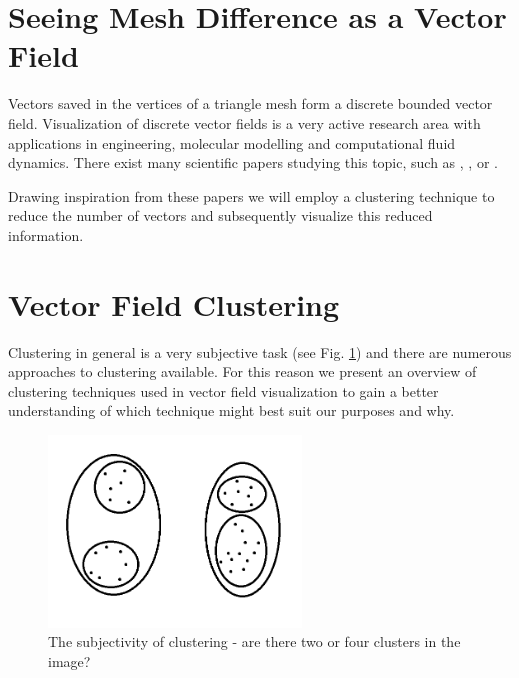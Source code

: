 \section{Seeing Mesh Difference as a Vector Field}

Vectors saved in the vertices of a triangle mesh form a discrete bounded vector field. Visualization of discrete vector fields is a very active research area with applications in engineering, molecular modelling and computational fluid dynamics. There exist many scientific papers studying this topic, such as \citet{Telea99}, \citet{Garcke00}, \citet{Du04} or \citet{Peng12}.

Drawing inspiration from these papers we will employ a clustering technique to reduce the number of vectors and subsequently visualize this reduced information.

\section{Vector Field Clustering}

Clustering in general is a very subjective task (see Fig. \ref{fig:clustering_subjectivity}) and there are numerous approaches to clustering available. For this reason we present an overview of clustering techniques used in vector field visualization to gain a better understanding of which technique might best suit our purposes and why.

\begin{figure}[h]
\centering
\includegraphics[width=0.6\textwidth]{./img/clustering_subjectivity.png}
\caption{The subjectivity of clustering - are there two or four clusters in the image?}
\label{fig:clustering_subjectivity}
\end{figure}

